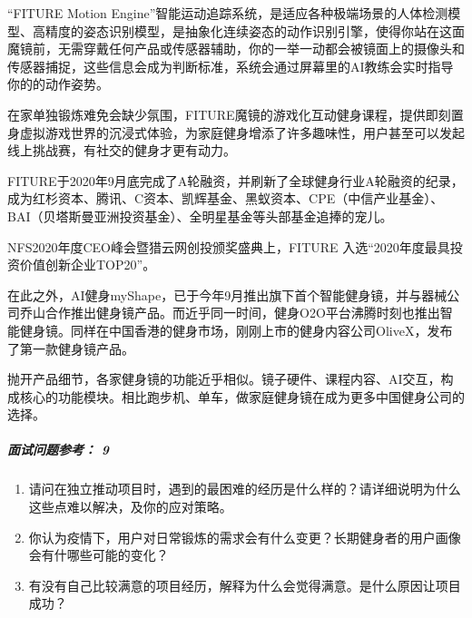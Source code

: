 \documentclass[letterpaper,11pt,english]{sphinxmanual}
\begin{document}
“FITURE Motion
Engine”智能运动追踪系统，是适应各种极端场景的人体检测模型、高精度的姿态识别模型，是抽象化连续姿态的动作识别引擎，使得你站在这面魔镜前，无需穿戴任何产品或传感器辅助，你的一举一动都会被镜面上的摄像头和传感器捕捉，这些信息会成为判断标准，系统会通过屏幕里的AI教练会实时指导你的的动作姿势。

在家单独锻炼难免会缺少氛围，FITURE魔镜的游戏化互动健身课程，提供即刻置身虚拟游戏世界的沉浸式体验，为家庭健身增添了许多趣味性，用户甚至可以发起线上挑战赛，有社交的健身才更有动力。

FITURE于2020年9月底完成了A轮融资，并刷新了全球健身行业A轮融资的纪录，成为红杉资本、腾讯、C资本、凯辉基金、黑蚁资本、CPE（中信产业基金）、BAI（贝塔斯曼亚洲投资基金）、全明星基金等头部基金追捧的宠儿。
%
\begin{footnote}[252]\sphinxAtStartFootnote
{}
%
\end{footnote}

NFS2020年度CEO峰会暨猎云网创投颁奖盛典上，FITURE
入选“2020年度最具投资价值创新企业TOP20”。

在此之外，AI健身myShape，已于今年9月推出旗下首个智能健身镜，并与器械公司乔山合作推出健身镜产品。而近乎同一时间，健身O2O平台沸腾时刻也推出智能健身镜。同样在中国香港的健身市场，刚刚上市的健身内容公司OliveX，发布了第一款健身镜产品。

抛开产品细节，各家健身镜的功能近乎相似。镜子硬件、课程内容、AI交互，构成核心的功能模块。相比跑步机、单车，做家庭健身镜在成为更多中国健身公司的选择。%
\begin{footnote}[253]\sphinxAtStartFootnote
{}
%
\end{footnote}


\subparagraph{面试问题参考： 9\sphinxfootnotemark[254]}
\label{\detokenize{chapter_project/AI_fit:id7}}%
\begin{footnotetext}[254]\sphinxAtStartFootnote
{}
%
\end{footnotetext}\ignorespaces \begin{enumerate}
%
\item {} 
请问在独立推动项目时，遇到的最困难的经历是什么样的？请详细说明为什么这些点难以解决，及你的应对策略。

\item {} 
你认为疫情下，用户对日常锻炼的需求会有什么变更？长期健身者的用户画像会有什哪些可能的变化？

\item {} 
有没有自己比较满意的项目经历，解释为什么会觉得满意。是什么原因让项目成功？

\end{enumerate}
\end{document}
